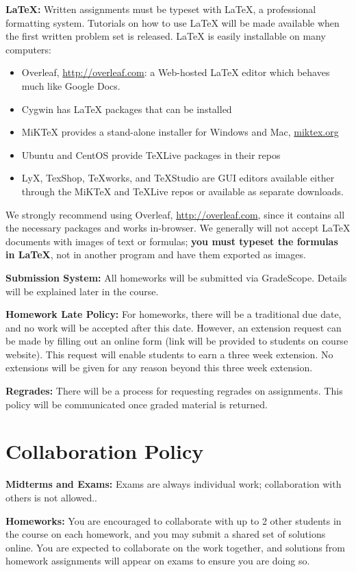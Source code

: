 \documentclass[12pt]{article}
\begin{document}
\textbf{\LaTeX:} Written assignments must be typeset with \LaTeX, a professional formatting system. Tutorials on how to use \LaTeX{} will be made available when the first written problem set is released. \LaTeX{} is easily installable on many computers: 
\begin{itemize}
    \item Overleaf, \url{http://overleaf.com}: a Web-hosted \LaTeX{} editor which behaves much like Google Docs.
    \item Cygwin has \LaTeX{} packages that can be installed
    \item MiKTeX provides a stand-alone installer for Windows and Mac, \url{miktex.org}
    \item Ubuntu and CentOS provide TeXLive packages in their repos
    \item LyX, TexShop, TeXworks, and TeXStudio are GUI editors available either through the MiKTeX and TeXLive repos or available as separate downloads.
\end{itemize}
We strongly recommend using Overleaf, \url{http://overleaf.com}, since it contains all the necessary packages and works in-browser. We generally will not accept \LaTeX{} documents with images of text or formulas; \textbf{you must typeset the formulas in \LaTeX}, not in another program and have them exported as images.

\textbf{Submission System:} All homeworks will be submitted via GradeScope. Details will be explained later in the course. 

\textbf{Homework Late Policy:} For homeworks, there will be a traditional due date, and no work will be accepted after this date. However, an extension request can be made by filling out an online form (link will be provided to students on course website). This request will enable students to earn a three week extension. No extensions will be given for any reason beyond this three week extension.

\textbf{Regrades:} There will be a process for requesting regrades on assignments. This policy will be communicated once graded material is returned.

\section*{Collaboration Policy}

\textbf{Midterms and Exams:} Exams are always individual work; collaboration with others is not allowed..

\textbf{Homeworks:} You are encouraged to collaborate with up to 2 other students in the course on each homework, and you may submit a shared set of solutions online. You are expected to collaborate on the work together, and solutions from homework assignments will appear on exams to ensure you are doing so.
\end{document}
